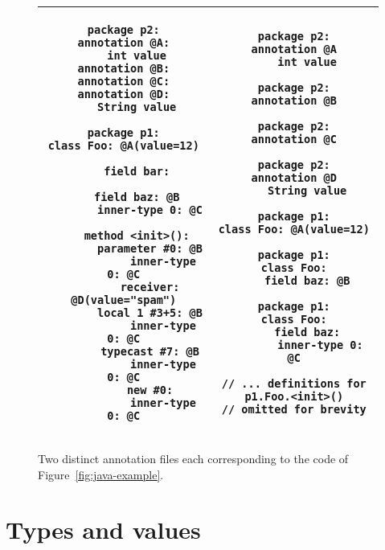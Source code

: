 \documentclass{article}
\begin{document}
\begin{figure}
\begin{tabular}{|c|c|}
\hline
\begin{minipage}[t]{.5\textwidth}
\begin{verbatim}
package p2:
annotation @A:
    int value
annotation @B:
annotation @C:
annotation @D:
    String value

package p1:
class Foo: @A(value=12)

    field bar:

    field baz: @B
        inner-type 0: @C

    method <init>():
        parameter #0: @B
            inner-type 0: @C
        receiver: @D(value="spam")
        local 1 #3+5: @B
            inner-type 0: @C
        typecast #7: @B
            inner-type 0: @C
        new #0:
            inner-type 0: @C
\end{verbatim}
\end{minipage}
&
\begin{minipage}[t]{.45\textwidth}
\begin{verbatim}
package p2:
annotation @A
    int value

package p2:
annotation @B

package p2:
annotation @C

package p2:
annotation @D
    String value

package p1:
class Foo: @A(value=12)

package p1:
class Foo:
    field baz: @B

package p1:
class Foo:
    field baz:
        inner-type 0: @C

// ... definitions for p1.Foo.<init>()
// omitted for brevity
\end{verbatim}
\end{minipage}
\\
\hline
\end{tabular}

\caption{Two distinct annotation files each corresponding to the code of
  Figure~\ref{fig:java-example}.}
\label{fig:annotation-file-examples}
\end{figure}


\section{Types and values}
\label{sec:typesvalues}
\end{document}
